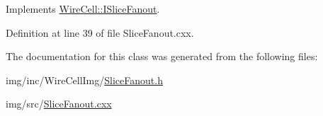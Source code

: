 Implements \hyperlink{class_wire_cell_1_1_i_slice_fanout_abde53bdfe0cef64ba3b05edcf111db65}{Wire\+Cell\+::\+I\+Slice\+Fanout}.



Definition at line 39 of file Slice\+Fanout.\+cxx.



The documentation for this class was generated from the following files\+:\begin{DoxyCompactItemize}
\item 
img/inc/\+Wire\+Cell\+Img/\hyperlink{_slice_fanout_8h}{Slice\+Fanout.\+h}\item 
img/src/\hyperlink{_slice_fanout_8cxx}{Slice\+Fanout.\+cxx}\end{DoxyCompactItemize}
